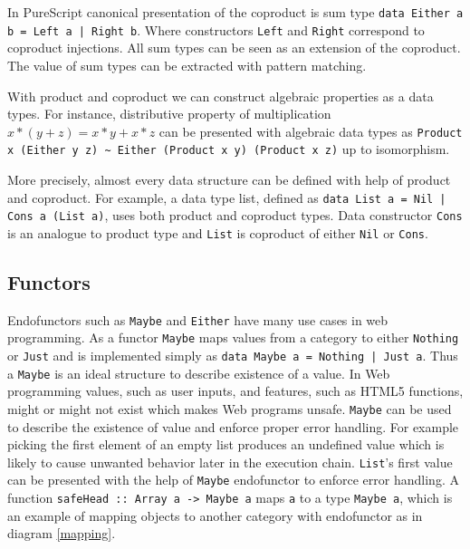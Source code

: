 \documentclass[article]{aaltoseries}
\begin{document}
    In PureScript canonical presentation of the coproduct is sum type
    \lstinline{data Either a b = Left a | Right b}. Where constructors
    \lstinline|Left| and \lstinline|Right| correspond to coproduct injections.
    All sum types can be seen as an extension of the coproduct. The value of sum
    types can be extracted with pattern matching.
    
    With product and coproduct we can construct algebraic properties as a data
    types. For instance, distributive property of multiplication $x * (y + z) =
    x * y + x * z$ can be presented with algebraic data types as
    \lstinline|Product x (Either y z) ~ Either (Product x y) (Product x z)| up
    to isomorphism.

    More precisely, almost every data structure can be defined with help of
    product and coproduct. For example, a data type list, defined as
    \lstinline{data List a = Nil | Cons a (List a)}, uses both product and
    coproduct types. Data constructor \lstinline|Cons| is an analogue to product
    type and \lstinline|List| is coproduct of either \lstinline|Nil| or \lstinline|Cons|.

    

  \subsection{Functors}
    Endofunctors such as \lstinline|Maybe| and \lstinline|Either| have many use
    cases in web programming. As a functor \lstinline|Maybe| maps values from a
    category to either \lstinline|Nothing| or \lstinline|Just| and is
    implemented simply as \lstinline{data Maybe a = Nothing | Just a}. Thus a
    \lstinline|Maybe| is an ideal structure to describe existence of a value. In
    Web programming values, such as user inputs, and features, such as HTML5
    functions, might or might not exist which makes Web programs unsafe.
    \lstinline|Maybe| can be used to describe the existence of value and enforce
    proper error handling. For example picking the first element of an empty
    list produces an undefined value which is likely to cause unwanted behavior
    later in the execution chain. \lstinline|List|'s first value can be
    presented with the help of \lstinline|Maybe| endofunctor to enforce error
    handling. A function \lstinline|safeHead :: Array a -> Maybe a| maps
    \lstinline|a| to a type \lstinline|Maybe a|, which is an example of mapping
    objects to another category with endofunctor as in diagram \ref{mapping}.
\end{document}
